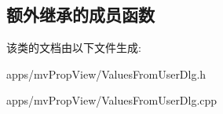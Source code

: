 \subsection*{额外继承的成员函数}


该类的文档由以下文件生成\+:\begin{DoxyCompactItemize}
\item 
apps/mv\+Prop\+View/Values\+From\+User\+Dlg.\+h\item 
apps/mv\+Prop\+View/Values\+From\+User\+Dlg.\+cpp\end{DoxyCompactItemize}
